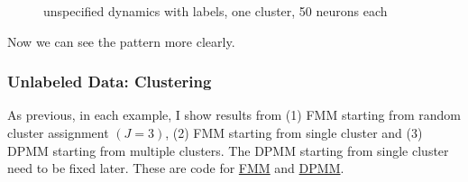 \documentclass[]{article}
\begin{document}
\begin{enumerate}
\begin{figure}[h!]
{			\centering
		}
		\caption{unspecified dynamics with labels, one cluster, 50 neurons each}
		\label{fig:no A labeled one cluster 50}
	\end{figure}

	Now we can see the pattern more clearly.
\end{enumerate}

\subsubsection{Unlabeled Data: Clustering}
As previous, in each example, I show results from (1) FMM starting from random cluster assignment \(\left(J = 3\right) \), (2) FMM starting from single cluster and (3) DPMM starting from multiple clusters. The DPMM starting from single cluster need to be fixed later. These are code for
\href{https://github.com/weigcdsb/state-space-clustering/blob/main/LDS/unspecifiedA_sample_MM.m}{FMM} and \href{https://github.com/weigcdsb/state-space-clustering/blob/main/LDS/unspecifiedA_sample_DP.m}{DPMM}.
\end{document}
